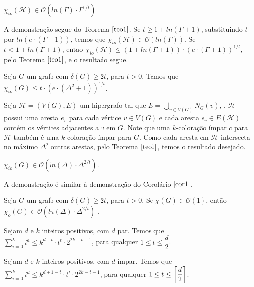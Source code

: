 \documentclass[12pt]{article}
\begin{document}
{\begin{cor} 
	\label{cor1}  
	$\chi_{io}(\mathcal{H}) \in \mathcal{O}(ln(\Gamma) {\cdot} \Gamma^{1/t})$
\end{cor}

	A demonstração segue do Teorema $\ref{teo1}$. Se $t \geq 1 + ln (\Gamma + 1)$, substituindo $t$ por $ln(e {\cdot} (\Gamma + 1))$, temos que $\chi_{io}(\mathcal{H}) \in \mathcal{O}(ln(\Gamma))$. Se $t < 1 + ln (\Gamma + 1)$, então $\chi_{io}(\mathcal{H}) \leq (1 + ln (\Gamma + 1)) {\cdot} (e {\cdot} (\Gamma + 1))^{1/t}$, pelo Teorema $\ref{teo1}$, e o resultado segue. \newbegin
	
\begin{cor}
	\label{cor2}  
	Seja $G$ um grafo com $\delta(G) \geq 2t$, para $t > 0$. Temos que $\chi_{io}(G) \leq t {\cdot} (e {\cdot} (\Delta^2 + 1))^{1/t}$.
\end{cor}
	 
	  Seja $\mathcal{H} = (V(G), E)$ um hipergrafo tal que $E = \bigcup\limits_{v \in V(G)}N_G(v)$, \ie, $\mathcal{H}$ possui uma aresta $e_v$ para cada vértice $v \in V(G)$ e cada aresta $e_v \in E(\mathcal{H})$ contém os vértices adjacentes a $v$ em $G$. Note que uma $k$-coloração  ímpar $c$ para $\mathcal{H}$ também é uma $k$-coloração ímpar para $G$. Como cada aresta em $\mathcal{H}$ intersecta no máximo $\Delta^2$ outras arestas, pelo Teorema $\ref{teo1}$, temos o resultado desejado. \newbegin

\begin{cor}
	\label{cor3}  
	 $\chi_{io}(G) \in \mathcal{O}(ln(\Delta) {\cdot} \Delta^{2/t})$.
\end{cor}
     
     A demonstração é similar à demonstração do Corolário $\ref{cor1}$.
\newbegin

\begin{teo}
	\label{teo2}  
	Seja $G$ um grafo com $\delta(G) \geq 2t$, para $t > 0$. Se $\chi(G) \in \mathcal{O}(1)$, então $\chi_{o}(G) \in \mathcal{O}(ln(\Delta) {\cdot} \Delta^{2/t})$ .
\end{teo} \newbegin

\begin{teo}
	\label{teo3}   
	Sejam $d$ e $k$ inteiros positivos, com $d$ par. Temos que $ \sum\limits_{i = 0}^{ k }i^{d}   \leq k^{d-t} {\cdot} t^t  {\cdot} 2^{2k-t-1} $, para qualquer $1 \leq t \leq \dfrac{d}{2}$.
\end{teo} \newbegin

\begin{cor}
	Sejam $d$ e $k$ inteiros positivos, com $d$ ímpar. Temos que $ \sum\limits_{i = 0}^{ k }i^{d}   \leq k^{d+1-t} {\cdot} t^t  {\cdot} 2^{2k-t-1} $, para qualquer $1 \leq t \leq \left \lceil \dfrac{d}{2} \right \rceil$.
\end{cor}

}
\end{document}
